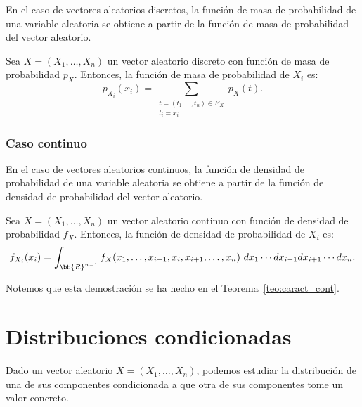 En el caso de vectores aleatorios discretos, la función de masa de probabilidad de una variable aleatoria se obtiene a partir de la función de masa de probabilidad del vector aleatorio.

\begin{prop} \label{prop:dist_marginal_disc}
    Sea $X=(X_1, \ldots, X_n)$ un vector aleatorio discreto con función de masa de probabilidad $p_X$. Entonces, la función de masa de probabilidad de $X_i$ es:
    \begin{equation*}
        p_{X_i}(x_i) = \sum_{\substack{t=(t_1,\dots,t_n)\in E_X\\t_i=x_i}} p_X(t).
    \end{equation*}
\end{prop}

\subsubsection{Caso continuo}

En el caso de vectores aleatorios continuos, la función de densidad de probabilidad de una variable aleatoria se obtiene a partir de la función de densidad de probabilidad del vector aleatorio.

\begin{prop} \label{prop:dist_marginal_cont}
    Sea $X=(X_1, \ldots, X_n)$ un vector aleatorio continuo con función de densidad de probabilidad $f_X$. Entonces, la función de densidad de probabilidad de $X_i$ es:
    \begin{equation*}
        f_{X_i}(x_i) = \int_{\bb{R}^{n-1}} f_X(x_1, \ldots, x_{i-1}, x_i, x_{i+1}, \ldots, x_n)~d x_1 \cdots d x_{i-1} d x_{i+1} \cdots d x_n.
    \end{equation*}
\end{prop}
Notemos que esta demostración se ha hecho en el Teorema~\ref{teo:caract_cont}.


\section{Distribuciones condicionadas}

Dado un vector aleatorio $X=(X_1, \ldots, X_n)$, podemos estudiar la distribución de una de sus componentes condicionada a que otra de sus componentes tome un valor concreto.

